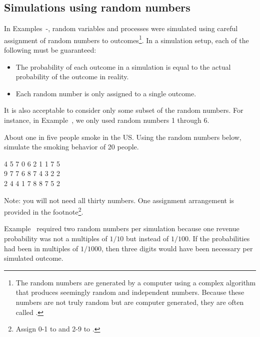 \subsection{Simulations using random numbers}

In Examples~-, random variables and processes were simulated using careful assignment of random numbers to outcomes\footnote{The random numbers are generated by a computer using a complex algorithm that produces seemingly random and independent numbers. Because these numbers are not truly random but are computer generated, they are often called .}. In a simulation setup, each of the following must be guaranteed:
\begin{itemize}
\item[(1)] The probability of each outcome in a simulation is equal to the actual probability of the outcome in reality.
\item[(2)] Each random number is only assigned to a single outcome.
\end{itemize}
It is also acceptable to consider only some subset of the random numbers. For instance, in Example~, we only used random numbers {1} through {6}. \\

\begin{exercise}
About one in five people smoke in the US. Using the random numbers below, simulate the smoking behavior of 20 people.
\begin{center}
4 5 7 0 6\hspace{3mm} 2 1 1 7 5 \\
9 7 7 6 8\hspace{3mm} 7 4 3 2 2 \\
2 4 4 1 7\hspace{3mm} 8 8 7 5 2 \\
\end{center}
Note: you will not need all thirty numbers. One assignment arrangement is provided in the footnote\footnote{Assign 0-1 to  and 2-9 to .}.
\end{exercise}

Example~ required two random numbers per simulation because one revenue probability was not a multiples of $1/10$ but instead of $1/100$. If the probabilities had been in multiples of $1/1000$, then three digits would have been necessary per simulated outcome. \\


